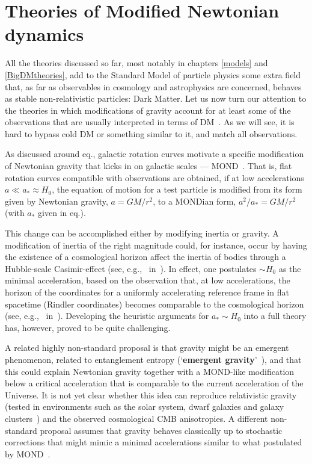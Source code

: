 \section{Theories of Modified Newtonian dynamics}\label{sec:MONDth}
All the theories discussed so far, most notably in chapters \ref{models} and \ref{BigDMtheories}, add to the Standard Model of particle physics
some extra field that, as far as observables in cosmology and astrophysics are concerned,
behaves as stable non-relativistic particles: Dark Matter.
Let us now turn our attention to the theories in which modifications of gravity account for at least some of the observations that are usually interpreted in terms of DM~\cite{MONDth}. 
 As we will see, it is  hard to  bypass cold DM or something  similar to it, and match all observations. 


As discussed around eq., 
galactic rotation curves motivate 
a specific modification of Newtonian gravity that kicks in on galactic scales --- MOND~\cite{MOND}.
That is, flat rotation curves compatible with observations are obtained, if at low accelerations $a \ll a_* \approx H_0$,  the equation of motion for a test particle
is modified from its form given by Newtonian gravity, $a = GM/r^2$, to a  MONDian form,
 $a^2/a_* = GM/r^2$ (with $a_*$ given in eq.). 


\smallskip
This change can  be accomplished either by modifying inertia or gravity. 
A modification of inertia of the right magnitude could, for instance, occur by having the existence of a cosmological horizon affect the inertia of bodies through a Hubble-scale Casimir-effect (see, e.g.,\   in~\cite{MONDth}).
In effect, one postulates $\sim H_0$ as the minimal acceleration, based on the observation that, at low accelerations, the horizon of 
the coordinates for a uniformly accelerating reference frame in flat spacetime (Rindler coordinates) becomes comparable to
the cosmological horizon (see, e.g.,\   in~\cite{MONDth}). 
Developing the heuristic arguments for $a_* \sim H_0$ into a full theory has, however, proved to be quite challenging.

A related highly non-standard proposal is that gravity might be an emergent phenomenon, related to entanglement entropy (`{\bf emergent gravity}'~\cite{emergentgravity}), 
and that this could explain Newtonian gravity together with a MOND-like modification 
below a critical acceleration that is comparable to the current acceleration of the Universe. 
It is not yet clear whether this idea can reproduce relativistic gravity
(tested in environments such as the solar system, dwarf galaxies and galaxy clusters~\cite{testsofEG})
and the observed cosmological CMB anisotropies.
A different non-standard  proposal assumes that gravity behaves classically up to stochastic corrections that might 
mimic a minimal accelerations similar to what postulated by MOND~\cite{Oppenheim}.

